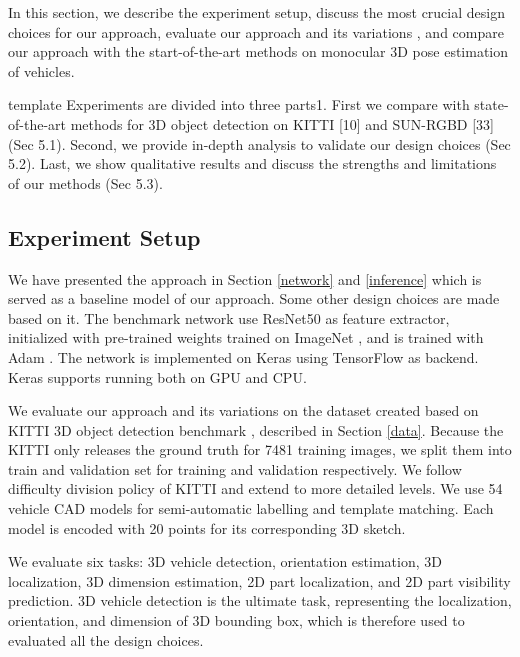 In this section, we describe the experiment setup, discuss the most crucial design choices for our approach, evaluate our approach and its variations , and compare our approach with the start-of-the-art methods on monocular 3D pose estimation of vehicles.  

template \tbd Experiments are divided into three parts1. First we compare with state-of-the-art methods for 3D object detection on KITTI [10] and SUN-RGBD [33] (Sec 5.1). Second, we provide in-depth analysis to validate our design choices (Sec 5.2). Last, we show qualitative results and discuss the strengths and limitations of our methods (Sec 5.3).

\subsection{Experiment Setup}

We have presented the approach in Section \ref{network} and \ref{inference} which is served as a baseline model of our approach. Some other design choices are made based on it. The benchmark network use ResNet50 \cite{DBLP:journals/corr/HeZRS15} as feature extractor, initialized with pre-trained weights trained on ImageNet \cite{DBLP:Russakovsky14}, and is trained with Adam \cite{DBLP:journals/corr/KingmaB14}. The network is implemented on Keras \cite{chollet2015keras} using TensorFlow \cite{tensorflow2015-whitepaper} as backend. Keras supports running both on GPU and CPU. 

We evaluate our approach and its variations on the dataset created based on KITTI 3D object detection benchmark \cite{Geiger2012CVPR}, described in Section \ref{data}. Because the KITTI only releases the ground truth for 7481 training images, we split them into train and validation set for training and validation respectively. We follow difficulty division policy of  KITTI and extend to more detailed levels. We use 54 vehicle CAD models \cite{NIPS2012_4562} for semi-automatic labelling and template matching. Each model is encoded with 20 points for its corresponding 3D sketch.

We evaluate six tasks: 3D vehicle detection, orientation estimation, 3D localization, 3D dimension estimation, 2D part localization, and 2D part visibility prediction. 3D vehicle detection is the ultimate task, representing the localization, orientation, and dimension of 3D bounding box,  which is therefore used to evaluated all the design choices.